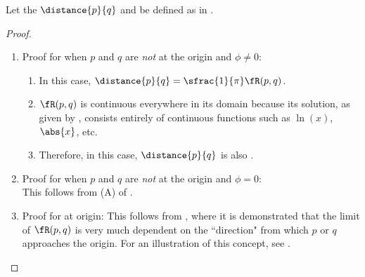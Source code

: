 \begin{theorem}
\label{thm:larc_cont}
Let the  $\distance{p}{q}$ and  
be defined as in .
\\
\end{theorem}
\begin{proof}
\begin{enumerate}
  \item Proof for when $p$ and $q$ are \emph{not} at the origin and $\phi\neq0$:
    \begin{enumerate}
      \item In this case, $\distance{p}{q}=\sfrac{1}{\pi}\fR(p,q)$.
      \item $\fR(p,q)$ is continuous everywhere in its domain because its solution,
            as given by , consists entirely of continuous functions
            such as $\ln(x)$, $\abs{x}$, etc.
      \item Therefore, in this case, $\distance{p}{q}$ is also .
    \end{enumerate}

  \item Proof for when $p$ and $q$ are \emph{not} at the origin and $\phi=0$:
        \\This follows from (A) of .

  \item Proof for  at origin:
      This follows from , where it is demonstrated that 
      the limit of $\fR(p,q)$ is very much dependent on the ``direction" from which $p$ or $q$ 
      approaches the origin.
      For an illustration of this concept, see .
\end{enumerate}
\end{proof}

